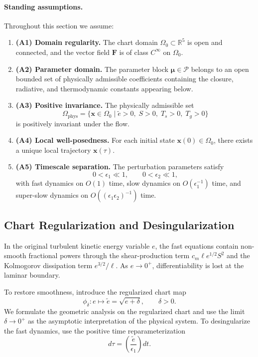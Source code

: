 \paragraph{Standing assumptions.}
Throughout this section we assume:
\begin{enumerate}
\item \textbf{(A1) Domain regularity.} The chart domain $\Omega_0 \subset \mathbb{R}^5$ is open and connected, and the vector field $\mathbf{F}$ is of class $C^\infty$ on $\Omega_0$.
\item \textbf{(A2) Parameter domain.} The parameter block $\boldsymbol{\mu} \in \mathcal{P}$ belongs to an open bounded set of physically admissible coefficients containing the closure, radiative, and thermodynamic constants appearing below.
\item \textbf{(A3) Positive invariance.} The physically admissible set
\begin{equation}
\Omega_{\mathrm{phys}}
= \{\mathbf{x} \in \Omega_0 \mid \tilde e > 0,\; S > 0,\; T_s > 0,\; T_g > 0\}
\end{equation}
is positively invariant under the flow.
\item \textbf{(A4) Local well-posedness.} For each initial state $\mathbf{x}(0) \in \Omega_0$, there exists a unique local trajectory $\mathbf{x}(\tau)$.
\item \textbf{(A5) Timescale separation.} The perturbation parameters satisfy
\begin{equation}
0 < \epsilon_1 \ll 1,
\qquad
0 < \epsilon_2 \ll 1,
\end{equation}
with fast dynamics on $O(1)$ time, slow dynamics on $O(\epsilon_1^{-1})$ time, and super-slow dynamics on $O((\epsilon_1\epsilon_2)^{-1})$ time.
\end{enumerate}

\subsection{Chart Regularization and Desingularization}

In the original turbulent kinetic energy variable $e$, the fast equations contain non-smooth fractional powers through the shear-production term $c_m \ell e^{1/2} S^2$ and the Kolmogorov dissipation term $e^{3/2}/\ell$. As $e \to 0^+$, differentiability is lost at the laminar boundary.

To restore smoothness, introduce the regularized chart map
\begin{equation}
\phi_\delta : e \mapsto \tilde e = \sqrt{e + \delta},
\qquad \delta > 0.
\end{equation}
We formulate the geometric analysis on the regularized chart and use the limit $\delta \to 0^+$ as the asymptotic interpretation of the physical system. To desingularize the fast dynamics, use the positive time reparameterization
\begin{equation}
d\tau = \left(\frac{\tilde e}{\epsilon_1}\right) dt.
\end{equation}

